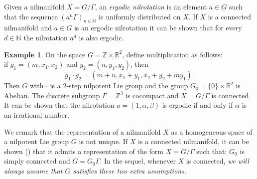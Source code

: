 \documentclass[11pt]{amsart}
\newcommand{\R}{\mathbb{R}}
\newcommand{\N}{\mathbb{N}}
\newcommand{\Z}{\mathbb{Z}}
\theoremstyle{plain}
\theoremstyle{definition}
\newtheorem{example}{Example}
\theoremstyle{remark}
\begin{document}
Given a nilmanifold $X=G/\Gamma$, an {\it ergodic
  nilrotation} is an element $a\in G$ such that the sequence
$(a^n\Gamma)_{n\in\N}$ is uniformly distributed on $X$. If $X$ is a connected nilmanifold and
$a\in G$ is an ergodic
nilrotation it can be shown that  for every $d\in \N$ the nilrotation
$a^d$ is also ergodic.


\begin{example}\label{E:1}
  On the space $G=\Z\times\R^2$,
  define multiplication as follows: \\
  if $g_1=(m,x_1,x_2)$ and $g_2=(n,y_1,y_2)$, then
$$
g_1\cdot g_2=(m+n,x_1+y_1, x_2+y_2+my_1).
$$
Then $G$ with $\cdot$ is a $2$-step nilpotent Lie group and the group
$G_0=\{0\}\times \R^2$ is Abelian. The discrete subgroup $\Gamma=\Z^3$
is cocompact and $X=G/\Gamma$ is connected. It can be shown that the
nilrotation $a=(1,\alpha,\beta)$ is ergodic if and only if $\alpha$
is an irrational number.
\end{example}



We remark that the representation of a nilmanifold $X$ as a homogeneous
space of a nilpotent Lie group $G$ is not unique. If $X$ is a
connected nilmanifold, it can be shown (\cite{L2}) that it admits a
representation of the form $X=G/\Gamma$ such that:
$G_0$ is simply connected and  $G=G_0\Gamma$.
In the sequel, whenever
$X$ is connected, {\it we will always assume that $G$ satisfies these two
extra assumptions}.



\end{document}

